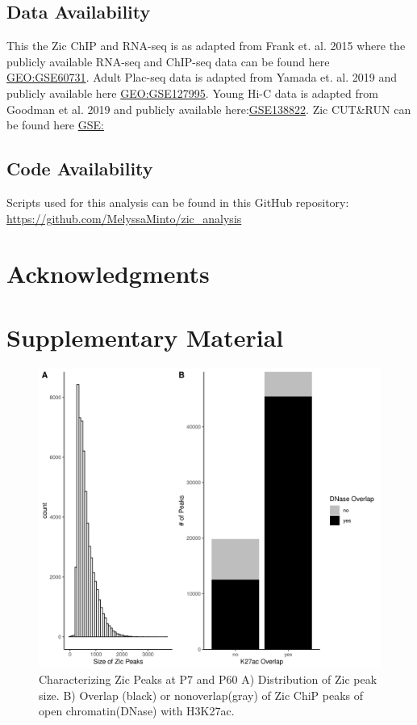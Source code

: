 \documentclass[fleqn,10pt]{wlscirep}
\begin{document}
\subsection*{Data Availability}
This the Zic ChIP and RNA-seq is as adapted from Frank et. al. 2015 \cite{Frank2015RegulationCerebellum} where the publicly available RNA-seq and ChIP-seq  data can be found here \href{https://www.ncbi.nlm.nih.gov/geo/query/acc.cgi?acc=GSE60731}{GEO:GSE60731}. Adult Plac-seq data is adapted from Yamada et. al. 2019 \cite{Yamada2019SensoryLearning} and publicly available here \href{https://www.ncbi.nlm.nih.gov/geo/query/acc.cgi?acc=GSE127995}{GEO:GSE127995}. Young Hi-C data is adapted from Goodman et al. 2019 \cite{Goodman2020TheBrain} and publicly available here:\href{https://www.ncbi.nlm.nih.gov/geo/query/acc.cgi?acc=GSE138822}{GSE138822}. Zic CUT&RUN can be found here \href{}{GSE:}

\subsection*{Code Availability}
Scripts used for this analysis can be found in this GitHub repository: \href{https://github.com/MelyssaMinto/zic_analysis}{https://github.com/MelyssaMinto/zic_analysis}

\section*{Acknowledgments}

\clearpage


\clearpage


\beginsupplement
\section*{Supplementary Material}

\begin{figure}[ht]
\centering
\includegraphics[width=.90\linewidth]{../figures/supp_figure1.png}
\caption{Characterizing Zic Peaks at P7 and P60 A) Distribution of Zic peak size. B) Overlap (black) or nonoverlap(gray) of Zic ChiP peaks of open chromatin(DNase) with H3K27ac. }
\label{fig:ZicStats}
\end{figure}
\end{document}
